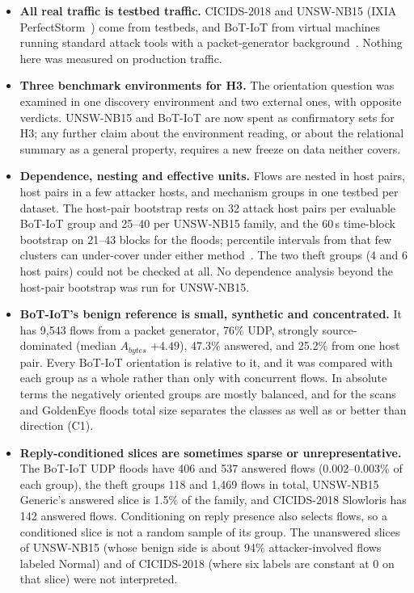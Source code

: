\documentclass[preprint,12pt]{elsarticle}
\begin{document}
\begin{itemize}
\item \textbf{All real traffic is testbed traffic.} CICIDS-2018 and UNSW-NB15 (IXIA PerfectStorm~\cite{moustafa2015unsw}) come from testbeds, and BoT-IoT from virtual machines running standard attack tools with a packet-generator background~\cite{koroniotis2019botiot}. Nothing here was measured on production traffic.
\item \textbf{Three benchmark environments for H3.} The orientation question was examined in one discovery environment and two external ones, with opposite verdicts. UNSW-NB15 and BoT-IoT are now spent as confirmatory sets for H3; any further claim about the environment reading, or about the relational summary as a general property, requires a new freeze on data neither covers.
\item \textbf{Dependence, nesting and effective units.} Flows are nested in host pairs, host pairs in a few attacker hosts, and mechanism groups in one testbed per dataset. The host-pair bootstrap rests on 32 attack host pairs per evaluable BoT-IoT group and 25--40 per UNSW-NB15 family, and the 60\,s time-block bootstrap on 21--43 blocks for the floods; percentile intervals from that few clusters can under-cover under either method~\cite{cameron2008bootstrap}. The two theft groups (4 and 6 host pairs) could not be checked at all. No dependence analysis beyond the host-pair bootstrap was run for UNSW-NB15.
\item \textbf{BoT-IoT's benign reference is small, synthetic and concentrated.} It has 9{,}543 flows from a packet generator, 76\% UDP, strongly source-dominated (median $A_{bytes}$ $+4.49$), 47.3\% answered, and 25.2\% from one host pair. Every BoT-IoT orientation is relative to it, and it was compared with each group as a whole rather than only with concurrent flows. In absolute terms the negatively oriented groups are mostly balanced, and for the scans and GoldenEye floods total size separates the classes as well as or better than direction (C1).
\item \textbf{Reply-conditioned slices are sometimes sparse or unrepresentative.} The BoT-IoT UDP floods have 406 and 537 answered flows (0.002--0.003\% of each group), the theft groups 118 and 1{,}469 flows in total, UNSW-NB15 Generic's answered slice is 1.5\% of the family, and CICIDS-2018 Slowloris has 142 answered flows. Conditioning on reply presence also selects flows, so a conditioned slice is not a random sample of its group. The unanswered slices of UNSW-NB15 (whose benign side is about 94\% attacker-involved flows labeled Normal) and of CICIDS-2018 (where six labels are constant at 0 on that slice) were not interpreted.

\end{itemize}
\end{document}
